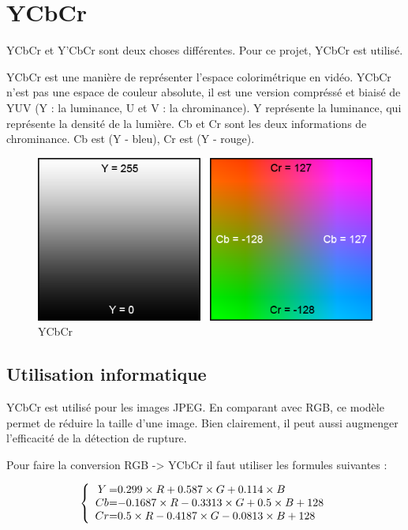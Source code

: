 \section{YCbCr}

YCbCr et Y’CbCr sont deux choses différentes. Pour ce projet, YCbCr est utilisé.

YCbCr est une manière de représenter l’espace colorimétrique en vidéo. YCbCr n’est pas une espace de couleur absolute, il est une version compréssé et biaisé de YUV (Y : la luminance, U et V : la chrominance). Y représente la luminance, qui représente la densité de la lumière. Cb et Cr sont les deux informations de chrominance. Cb est (Y - bleu), Cr est (Y - rouge).

\begin{figure}[h!]
      \centering
      \includegraphics[scale=0.6]{images/YCbCr.png}
      \caption{\label{YCbCr}YCbCr}
\end{figure}


\subsection{Utilisation informatique}
YCbCr est utilisé pour les images JPEG. En comparant avec RGB, ce modèle permet de réduire la taille d’une image. Bien clairement, il peut aussi augmenger l’efficacité de la détection de rupture.

Pour faire la conversion RGB -> YCbCr il faut utiliser les formules suivantes :

\[
 \left \{
 \begin{array}{c @{=} l}
	Y & 0.299 \times R + 0.587 \times G + 0.114 \times B \\
	Cb & -0.1687 \times R - 0.3313 \times G + 0.5 \times B + 128 \\
	Cr & 0.5 \times R - 0.4187 \times G - 0.0813 \times B + 128 \\
 \end{array}
 \right.
\]

